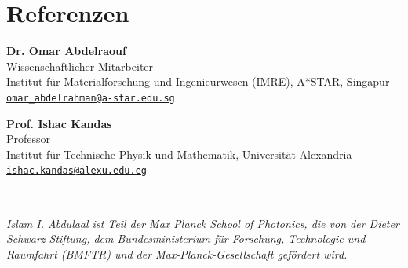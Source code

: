 \documentclass[11pt,a4paper]{article}
\begin{document}
\section*{Referenzen}
\noindent
\begin{minipage}[t]{0.48\textwidth}
\textbf{Dr. Omar Abdelraouf} \\
Wissenschaftlicher Mitarbeiter \\
Institut für Materialforschung und Ingenieurwesen (IMRE), A*STAR, Singapur \\
 \href{mailto:omar_abdelrahman@a-star.edu.sg}{\nolinkurl{omar_abdelrahman@a-star.edu.sg}}
\end{minipage}%
\hfill
\begin{minipage}[t]{0.48\textwidth}
\textbf{Prof. Ishac Kandas} \\
Professor \\
Institut für Technische Physik und Mathematik, Universität Alexandria \\
 \href{mailto:ishac.kandas@alexu.edu.eg}{\nolinkurl{ishac.kandas@alexu.edu.eg}}
\end{minipage}

\vspace{8pt}
\noindent\rule{\textwidth}{0.4pt}\\[3pt]
{\small\textit{Islam I. Abdulaal ist Teil der Max Planck School of Photonics, die von der Dieter Schwarz Stiftung, dem Bundesministerium für Forschung, Technologie und Raumfahrt (BMFTR) und der Max-Planck-Gesellschaft gefördert wird.}}
\end{document}
